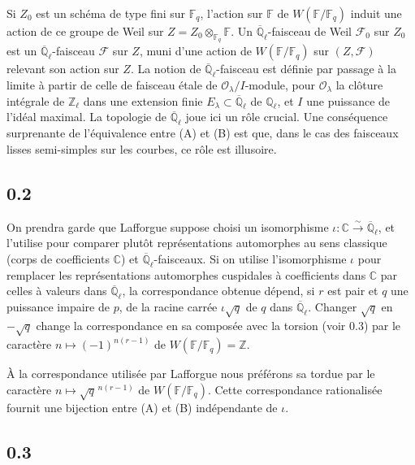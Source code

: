 \documentclass[10pt,a4paper]{article}
\theoremstyle{plain}
\theoremstyle{definition}
\begin{document}
Si $Z_0$ est un sch\'ema de type fini sur $\mathbb{F}_q$, l'action sur $\mathbb{F}$ de $W(\mathbb{F}/\mathbb{F}_q)$ induit une action de ce groupe de Weil sur $Z = Z_0 \otimes_{\mathbb{F}_q} \mathbb{F}$. Un $\overline{\mathbb{Q}}_\ell$-faisceau de Weil $\mathcal{F}_0$ sur $Z_0$ est un $\overline{\mathbb{Q}}_\ell$-faisceau $\mathcal{F}$ sur $Z$, muni d'une action de $W(\mathbb{F}/\mathbb{F}_q)$ sur $(Z,\mathcal{F})$ relevant son action sur $Z$. La notion de $\overline{\mathbb{Q}}_\ell$-faisceau est d\'efinie par passage \`a la limite \`a partir de celle de faisceau \'etale de $\mathcal{O}_\lambda/I$-module, pour $\mathcal{O}_\lambda$ la cl\^oture int\'egrale de $\mathbb{Z}_\ell$ dans une extension finie $E_\lambda \subset \overline{\mathbb{Q}}_\ell$ de $\mathbb{Q}_\ell$, et $I$ une puissance de l'id\'eal maximal. La topologie de $\overline{\mathbb{Q}}_\ell$ joue ici un r\^ole crucial. Une cons\'equence surprenante de l'\'equivalence entre (A) et (B) est que, dans le cas des faisceaux lisses semi-simples sur les courbes, ce r\^ole est illusoire.

\subsection*{0.2}

On prendra garde que Lafforgue suppose choisi un isomorphisme $\iota: \mathbb{C} \xrightarrow{\sim} \overline{\mathbb{Q}}_\ell$, et l'utilise pour comparer plut\^ot repr\'esentations automorphes au sens classique (corps de coefficients $\mathbb{C}$) et $\overline{\mathbb{Q}}_\ell$-faisceaux. Si on utilise l'isomorphisme $\iota$ pour remplacer les repr\'esentations automorphes cuspidales \`a coefficients dans $\mathbb{C}$ par celles \`a valeurs dans $\overline{\mathbb{Q}}_\ell$, la correspondance obtenue d\'epend, si $r$ est pair et $q$ une puissance impaire de $p$, de la racine carr\'ee $\iota\sqrt{q}$ de $q$ dans $\overline{\mathbb{Q}}_\ell$. Changer $\sqrt{q}$ en $-\sqrt{q}$ change la correspondance en sa compos\'ee avec la torsion (voir 0.3) par le caract\`ere $n \mapsto (-1)^{n(r-1)}$ de $W(\mathbb{F}/\mathbb{F}_q) = \mathbb{Z}$.

\`A la correspondance utilis\'ee par Lafforgue nous pr\'ef\'erons sa tordue par le caract\`ere $n \mapsto \sqrt{q}^{\,n(r-1)}$ de $W(\mathbb{F}/\mathbb{F}_q)$. Cette correspondance rationalis\'ee fournit une bijection entre (A) et (B) ind\'ependante de $\iota$.

\subsection*{0.3}
\end{document}
